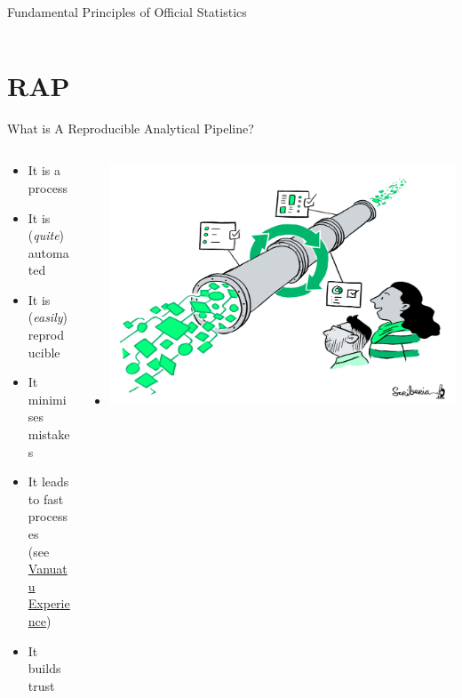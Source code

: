 \documentclass[xcolor=x11names,compress]{beamer}
\renewcommand{\(}{\begin{columns}}
\renewcommand{\)}{\end{columns}}
\newcommand{\<}[1]{\begin{column}{#1}}
\renewcommand{\>}{\end{column}}
\begin{document}
\begin{frame}{Fundamental Principles of Official Statistics}
\begin{columns}[T]
\begin{column}{0.4\textwidth}
    \end{column}
  \end{columns}
\end{frame}

\section{RAP}  %

\begin{frame}{What is A Reproducible Analytical Pipeline?}
  \begin{columns}[T]
    \begin{column}{0.5\textwidth}
      \begin{itemize}[<+->]
        \item It is a process %
        \item It is (\emph{quite}) automated
        \item It is (\emph{easily}) reproducible
        \item It minimises mistakes
        \item It leads to fast processes\\ (see \href{https://github.com/Vanuatu-National-Statistics-Office/vnso-RAP-marketStats-materials}{Vanuatu Experience})
        \item It builds trust
      \end{itemize}
    \end{column}
    \begin{column}{0.5\textwidth}
    \begin{itemize}
        \item[] \includegraphics[width=1.0\textwidth]{ReusablePipeline.png}
    \end{itemize}
    \end{column}
  \end{columns}
\end{frame}
\end{document}
